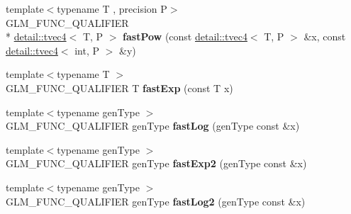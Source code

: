 \begin{DoxyCompactItemize}
\item 
\hypertarget{namespaceglm_a63ff761e1385c85dcf82e75628710e3e}{{\footnotesize template$<$typename T , precision P$>$ }\\G\-L\-M\-\_\-\-F\-U\-N\-C\-\_\-\-Q\-U\-A\-L\-I\-F\-I\-E\-R \\*
\hyperlink{structglm_1_1detail_1_1tvec4}{detail\-::tvec4}$<$ T, P $>$ {\bfseries fast\-Pow} (const \hyperlink{structglm_1_1detail_1_1tvec4}{detail\-::tvec4}$<$ T, P $>$ \&x, const \hyperlink{structglm_1_1detail_1_1tvec4}{detail\-::tvec4}$<$ int, P $>$ \&y)}\label{namespaceglm_a63ff761e1385c85dcf82e75628710e3e}

\item 
\hypertarget{namespaceglm_ae74f5cf7dd2cf7bd620d0e715ce57c05}{{\footnotesize template$<$typename T $>$ }\\G\-L\-M\-\_\-\-F\-U\-N\-C\-\_\-\-Q\-U\-A\-L\-I\-F\-I\-E\-R T {\bfseries fast\-Exp} (const T x)}\label{namespaceglm_ae74f5cf7dd2cf7bd620d0e715ce57c05}

\item 
\hypertarget{namespaceglm_a8d28d8da7024cc0a18d156d049a82ce8}{{\footnotesize template$<$typename gen\-Type $>$ }\\G\-L\-M\-\_\-\-F\-U\-N\-C\-\_\-\-Q\-U\-A\-L\-I\-F\-I\-E\-R gen\-Type {\bfseries fast\-Log} (gen\-Type const \&x)}\label{namespaceglm_a8d28d8da7024cc0a18d156d049a82ce8}

\item 
\hypertarget{namespaceglm_a1c48964bb8d608e6ae476f68a31a6a36}{{\footnotesize template$<$typename gen\-Type $>$ }\\G\-L\-M\-\_\-\-F\-U\-N\-C\-\_\-\-Q\-U\-A\-L\-I\-F\-I\-E\-R gen\-Type {\bfseries fast\-Exp2} (gen\-Type const \&x)}\label{namespaceglm_a1c48964bb8d608e6ae476f68a31a6a36}

\item 
\hypertarget{namespaceglm_ae1503280ca86994a0271217cb09335d6}{{\footnotesize template$<$typename gen\-Type $>$ }\\G\-L\-M\-\_\-\-F\-U\-N\-C\-\_\-\-Q\-U\-A\-L\-I\-F\-I\-E\-R gen\-Type {\bfseries fast\-Log2} (gen\-Type const \&x)}\label{namespaceglm_ae1503280ca86994a0271217cb09335d6}


\end{DoxyCompactItemize}
